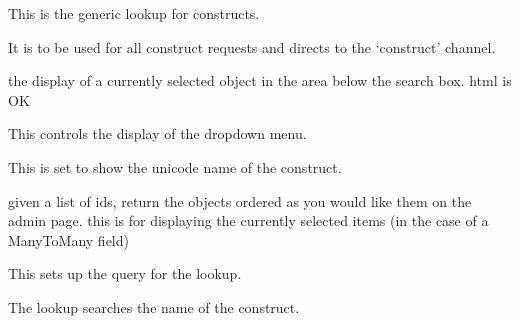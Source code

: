 \documentclass[letterpaper,10pt,english]{sphinxmanual}
\begin{document}

\begin{fulllineitems}
\label{api:experimentdb.reagents.lookups.ConstructLookup}
This is the generic lookup for constructs.

It is to be used for all construct requests and directs to the `construct' channel.

\begin{fulllineitems}
\label{api:experimentdb.reagents.lookups.ConstructLookup.format_item}
the display of a currently selected object in the area below the search box. html is OK

\end{fulllineitems}


\begin{fulllineitems}
\label{api:experimentdb.reagents.lookups.ConstructLookup.format_result}
This controls the display of the dropdown menu.

This is set to show the unicode name of the construct.

\end{fulllineitems}


\begin{fulllineitems}
\label{api:experimentdb.reagents.lookups.ConstructLookup.get_objects}
given a list of ids, return the objects ordered as you would like them on the admin page.
this is for displaying the currently selected items (in the case of a ManyToMany field)

\end{fulllineitems}


\begin{fulllineitems}
\label{api:experimentdb.reagents.lookups.ConstructLookup.get_query}
This sets up the query for the lookup.

The lookup searches the name of the construct.

\end{fulllineitems}


\end{fulllineitems}
\end{document}
